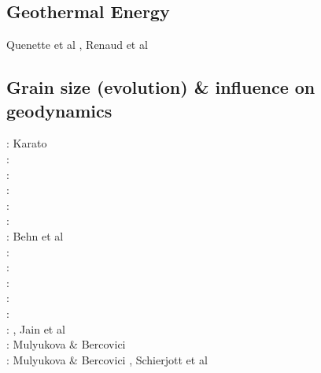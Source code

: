 \subsection{Geothermal Energy} 

\begin{scriptsize}
Quenette et al \cite{quxm15}, Renaud et al \cite{revf19}
\end{scriptsize}

\subsection{Grain size (evolution) \& influence on geodynamics}
\label{sec:topics:gsev}

\begin{scriptsize}
\nineteeneightyfour: Karato \cite{kara84}\\
\nineteeneightynine: \cite{brcp99}\\
\twothousandone: \cite{dets01}\cite{solo01}\\
\twothousandtwo: \cite{soet02}\\
\twothousandthree: \cite{hapa03}\cite{reyu03}\\
\twothousandeight: \cite{sore08}\\
\twothousandnine: Behn et al \cite{behe09}\\
\twothousandeleven: \cite{rorb11}\\
\twothousandthirteen: \cite{beri13}\\
\twothousandfourteen: \cite{besr14}\\
\twothousandfifteen: \cite{thrk15}\cite{tukb15}\cite{pevp15}\cite{glfa15}\\
\twothousandseventeen: \cite{ceww17}\cite{daef17}\cite{mube17}\cite{scdu17}\\
\twothousandeighteen: \cite{bemu18}\cite{bezb18}\cite{mube18}, Jain et al \cite{jakk18}\\
\twothousandnineteen: Mulyukova \& Bercovici \cite{mube19}\\
\twothousandtwenty: Mulyukova \& Bercovici \cite{mube20}, Schierjott et al \cite{scrt20}
\end{scriptsize}

